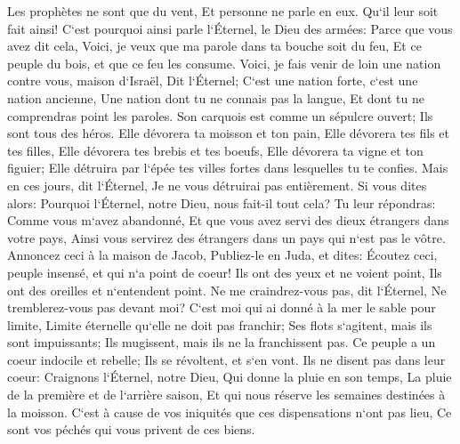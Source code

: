 \verse Les prophètes ne sont que du vent, Et personne ne parle en eux. Qu`il leur soit fait ainsi! 
\verse C`est pourquoi ainsi parle l`Éternel, le Dieu des armées: Parce que vous avez dit cela, Voici, je veux que ma parole dans ta bouche soit du feu, Et ce peuple du bois, et que ce feu les consume. 
\verse Voici, je fais venir de loin une nation contre vous, maison d`Israël, Dit l`Éternel; C`est une nation forte, c`est une nation ancienne, Une nation dont tu ne connais pas la langue, Et dont tu ne comprendras point les paroles. 
\verse Son carquois est comme un sépulcre ouvert; Ils sont tous des héros. 
\verse Elle dévorera ta moisson et ton pain, Elle dévorera tes fils et tes filles, Elle dévorera tes brebis et tes boeufs, Elle dévorera ta vigne et ton figuier; Elle détruira par l`épée tes villes fortes dans lesquelles tu te confies. 
\verse Mais en ces jours, dit l`Éternel, Je ne vous détruirai pas entièrement. 
\verse Si vous dites alors: Pourquoi l`Éternel, notre Dieu, nous fait-il tout cela? Tu leur répondras: Comme vous m`avez abandonné, Et que vous avez servi des dieux étrangers dans votre pays, Ainsi vous servirez des étrangers dans un pays qui n`est pas le vôtre. 
\verse Annoncez ceci à la maison de Jacob, Publiez-le en Juda, et dites: 
\verse Écoutez ceci, peuple insensé, et qui n`a point de coeur! Ils ont des yeux et ne voient point, Ils ont des oreilles et n`entendent point. 
\verse Ne me craindrez-vous pas, dit l`Éternel, Ne tremblerez-vous pas devant moi? C`est moi qui ai donné à la mer le sable pour limite, Limite éternelle qu`elle ne doit pas franchir; Ses flots s`agitent, mais ils sont impuissants; Ils mugissent, mais ils ne la franchissent pas. 
\verse Ce peuple a un coeur indocile et rebelle; Ils se révoltent, et s`en vont. 
\verse Ils ne disent pas dans leur coeur: Craignons l`Éternel, notre Dieu, Qui donne la pluie en son temps, La pluie de la première et de l`arrière saison, Et qui nous réserve les semaines destinées à la moisson. 
\verse C`est à cause de vos iniquités que ces dispensations n`ont pas lieu, Ce sont vos péchés qui vous privent de ces biens. 
